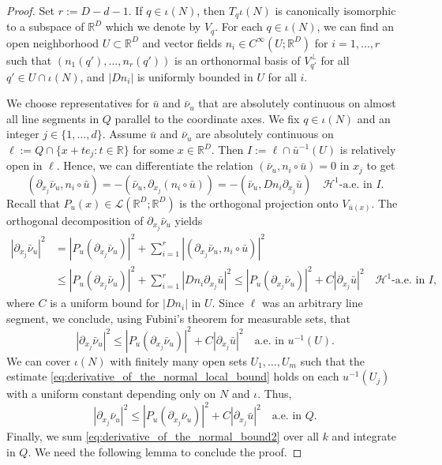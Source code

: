 \documentclass{article}
\numberwithin{equation}{section}
\theoremstyle{definition}
\theoremstyle{remark}
\begin{document}
\begin{proof}
    Set $r := D - d - 1$. If $q \in \iota(N)$, then $T_q\iota(N)$ is canonically isomorphic to a subspace of $\mathbb{R}^D$ which we denote by $V_q$. For each $q \in \iota(N)$, we can find an open neighborhood $U \subset \mathbb{R}^D$ and vector fields $n_i \in C^\infty(U; \mathbb{R}^D)$ for $i = 1, \dots, r$ such that $(n_1(q'), \dots, n_r(q'))$ is an orthonormal basis of $V_{q'}^\perp$ for all $q' \in U \cap \iota(N)$, and $|Dn_i|$ is uniformly bounded in $U$ for all $i$. 

    We choose representatives for $\bar{u}$ and $\bar{\nu}_u$ that are absolutely continuous on almost all line segments in $Q$ parallel to the coordinate axes. We fix $q \in \iota(N)$ and an integer $j \in \{1, \dots, d\}$. Assume $\bar{u}$ and $\bar{\nu}_u$ are absolutely continuous on $\ell := Q \cap \{x + te_j : t \in \mathbb{R}\}$ for some $x \in \mathbb{R}^D$. Then $I := \ell \cap \bar{u}^{-1}(U)$ is relatively open in $\ell$. Hence, we can differentiate the relation $(\bar{\nu}_u, n_i \circ \bar{u}) = 0$ in $x_j$ to get
    \[
    (\partial_{x_j}\bar{\nu}_u, n_i \circ \bar{u}) = -(\bar{\nu}_u, \partial_{x_j}(n_i \circ \bar{u})) = -(\bar{\nu}_u, Dn_i \partial_{x_j}\bar{u}) \quad \mathcal{H}^1\text{-a.e. in } I.
    \]
    Recall that $P_u(x) \in \mathcal{L}(\mathbb{R}^D; \mathbb{R}^D)$ is the orthogonal projection onto $V_{\bar{u}(x)}$. The orthogonal decomposition of $\partial_{x_j} \bar{\nu}_u$ yields
    \begin{align*}
        |\partial_{x_j} \bar{\nu}_u|^2 &= |P_u(\partial_{x_j} \bar{\nu}_u)|^2 + \sum_{i = 1}^r |(\partial_{x_j} \bar{\nu}_u, n_i \circ \bar{u} )|^2 \\
        &\le |P_u(\partial_{x_j} \bar{\nu}_u)|^2 + \sum_{i = 1}^r |Dn_i \partial_{x_j}\bar{u}|^2 \le |P_u(\partial_{x_j} \bar{\nu}_u)|^2 + C |\partial_{x_j} \bar{u}|^2 \quad \mathcal{H}^1\text{-a.e. in } I,
    \end{align*}
    where $C$ is a uniform bound for $|Dn_i|$ in $U$. Since $\ell$ was an arbitrary line segment, we conclude, using Fubini's theorem for measurable sets, that
    \begin{equation} \label{eq:derivative_of_the_normal_local_bound}
        |\partial_{x_j} \bar{\nu}_u|^2 \le |P_u(\partial_{x_j} \bar{\nu}_u)|^2 + C |\partial_{x_j} \bar{u}|^2 \quad \text{a.e. in } u^{-1}(U). 
    \end{equation}
    We can cover $\iota(N)$ with finitely many open sets $U_1, \dots, U_m$ such that the estimate \eqref{eq:derivative_of_the_normal_local_bound} holds on each $u^{-1}(U_j)$ with a uniform constant depending only on $N$ and $\iota$. Thus,
    \begin{equation} \label{eq:derivative_of_the_normal_bound2}
        |\partial_{x_j} \bar{\nu}_u|^2 \le |P_u(\partial_{x_j} \bar{\nu}_u)|^2 + C |\partial_{x_j} \bar{u}|^2 \quad \text{a.e. in } Q.
    \end{equation}
    Finally, we sum \eqref{eq:derivative_of_the_normal_bound2} over all $k$ and integrate in $Q$. We need the following lemma to conclude the proof.
\end{proof}
\end{document}
